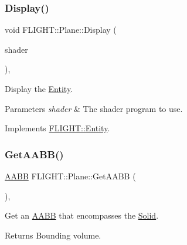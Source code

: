 \subsubsection{\texorpdfstring{Display()}{Display()}}
{\footnotesize\ttfamily void F\+L\+I\+G\+H\+T\+::\+Plane\+::\+Display (\begin{DoxyParamCaption}\item[{\hyperlink{class_f_l_i_g_h_t_1_1_shader_program}{Shader\+Program} \&}]{shader }\end{DoxyParamCaption})\hspace{0.3cm}{\ttfamily [override]}, {\ttfamily [virtual]}}



Display the \hyperlink{class_f_l_i_g_h_t_1_1_entity}{Entity}. 


\begin{DoxyParams}{Parameters}
{\em shader} & The shader program to use. \\
\hline
\end{DoxyParams}


Implements \hyperlink{class_f_l_i_g_h_t_1_1_entity_aa7416cd150913194b32255a46c2848ba}{F\+L\+I\+G\+H\+T\+::\+Entity}.

\mbox{\label{class_f_l_i_g_h_t_1_1_plane_ada18a4bb3fa0cdbb4ab7a412eba92fe2}} 
\subsubsection{\texorpdfstring{Get\+A\+A\+B\+B()}{GetAABB()}}
{\footnotesize\ttfamily \hyperlink{class_f_l_i_g_h_t_1_1_a_a_b_b}{A\+A\+BB} F\+L\+I\+G\+H\+T\+::\+Plane\+::\+Get\+A\+A\+BB (\begin{DoxyParamCaption}{ }\end{DoxyParamCaption})\hspace{0.3cm}{\ttfamily [override]}, {\ttfamily [virtual]}}



Get an \hyperlink{class_f_l_i_g_h_t_1_1_a_a_b_b}{A\+A\+BB} that encompasses the \hyperlink{class_f_l_i_g_h_t_1_1_solid}{Solid}. 

\begin{DoxyReturn}{Returns}
Bounding volume. 
\end{DoxyReturn}


